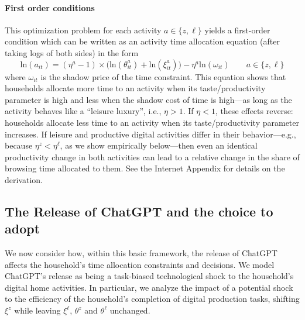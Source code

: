\documentclass[12pt]{article}
\begin{document}
\paragraph{First order conditions}
This optimization problem for each activity $a\in\{z,\ell\}$ yields a first-order condition which can be written as an activity time allocation equation (after taking logs of both sides) in the form
\begin{equation}
\label{eq:stylized-model-productive-activity-foc}
     \text{ln}(a_{it}) = (\eta^a - 1) \times \big(  \text{ln}(\theta_{it}^a) +  \text{ln}(\xi_{it}^a) \big) - \eta^{a} \text{ln}(\omega_{it})   \qquad a\in\{z,\ell\}
\end{equation}
where $\omega_{it}$ is the shadow price of the time constraint. This equation shows that households allocate more time to an activity when its taste/productivity parameter is high  and less when the shadow cost of time is high---as long as the activity behaves like a ``leisure luxury'', i.e., $\eta > 1$. If $\eta < 1$, these effects reverse:   households allocate less time to an activity when its taste/productivity parameter increases. If leisure and productive digital activities differ in their behavior---e.g., because $\eta^z < \eta^{\ell}$, as we show empirically below---then even an identical productivity change in both activities can lead to a relative change in the share of browsing time allocated to them. See the Internet Appendix for details on the derivation.


\subsection{The Release of ChatGPT and the choice to adopt}

We now consider how, within this basic framework, the release of ChatGPT affects the household's time allocation constraints and decisions. We model ChatGPT's release as being a task-biased technological shock to the household's digital home activities. In particular, we analyze the impact of a potential shock to the efficiency of the household's completion of digital production tasks, shifting $\xi^z$ while leaving $\xi^{\ell}$, $\theta^z$ and $\theta^{\ell}$ unchanged.
\end{document}
